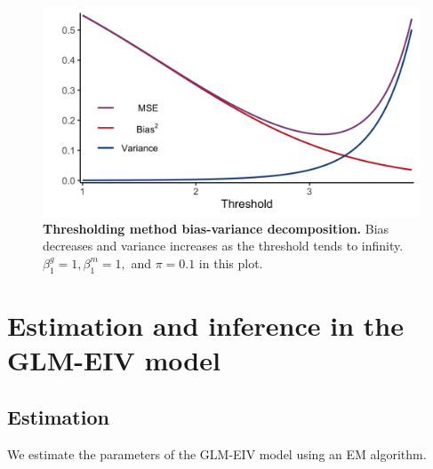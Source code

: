 \documentclass[12pt]{article}
\begin{document}
\begin{appendices}
\begin{refsection}
\begin{figure}[h]
	\centering
	\includegraphics[width=0.7\linewidth]{figures/bv_decomp.jpeg}
	\caption{\textbf{Thresholding method bias-variance decomposition.} Bias decreases and variance increases as the threshold tends to infinity. $\beta^g_1 = 1, \beta^m_1 = 1,$ and $\pi = 0.1$ in this plot.}
	\label{thresholding_theoretical}
\end{figure}
		
\section{Estimation and inference in the GLM-EIV model}\label{sec:glmeiv_details}
		\subsection{Estimation}
		We estimate the parameters of the GLM-EIV model using an EM algorithm.

\end{refsection}
\end{appendices}
\end{document}
